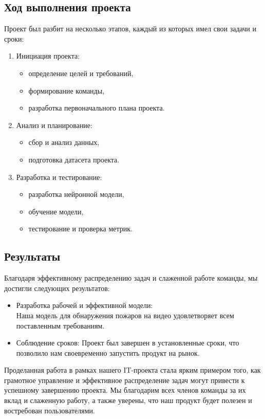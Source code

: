     \subsection*{Ход выполнения проекта}
    Проект был разбит на несколько этапов, каждый из которых имел свои задачи и сроки:
    \begin{enumerate}
        \item Инициация проекта:
            \begin{itemize}
                \item определение целей и требований,
                \item формирование команды,
                \item разработка первоначального плана проекта.
            \end{itemize}
        \item Анализ и планирование:
            \begin{itemize}
                \item сбор и анализ данных,
                \item подготовка датасета проекта.
            \end{itemize}
        \item Разработка и тестирование:
            \begin{itemize}
                \item разработка нейронной модели,
                \item обучение модели,
                \item тестирование и проверка метрик.
            \end{itemize}
    \end{enumerate}

    \subsection*{Результаты}
    Благодаря эффективному распределению задач и слаженной работе команды, мы достигли следующих результатов:
    \begin{itemize}
        \item Разработка рабочей и эффективной модели: \\
            Наша модель для обнаружения пожаров на видео удовлетворяет всем поставленным требованиям.
        \item Соблюдение сроков: Проект был завершен в установленные сроки, что позволило нам своевременно запустить продукт на рынок.
    \end{itemize}

    Проделанная работа в рамках нашего IT-проекта стала ярким примером того, как грамотное управление и эффективное распределение задач могут привести к успешному завершению проекта. Мы благодарим всех членов команды за их вклад и слаженную работу, а также уверены, что наш продукт будет полезен и востребован пользователями.
    
\endinput